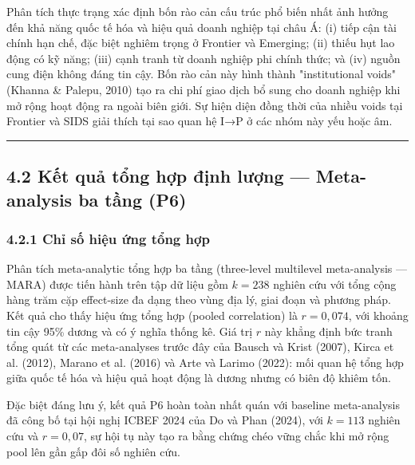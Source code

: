 \documentclass[12pt,a4paper]{article}
\begin{document}
Phân tích thực trạng xác định bốn rào cản cấu trúc phổ biến nhất ảnh
hưởng đến khả năng quốc tế hóa và hiệu quả doanh nghiệp tại châu Á: (i)
tiếp cận tài chính hạn chế, đặc biệt nghiêm trọng ở Frontier và
Emerging; (ii) thiếu hụt lao động có kỹ năng; (iii) cạnh tranh từ doanh
nghiệp phi chính thức; và (iv) nguồn cung điện không đáng tin cậy. Bốn
rào cản này hình thành "institutional voids" (Khanna \& Palepu, 2010)
tạo ra chi phí giao dịch bổ sung cho doanh nghiệp khi mở rộng hoạt động
ra ngoài biên giới. Sự hiện diện đồng thời của nhiều voids tại Frontier
và SIDS giải thích tại sao quan hệ I→P ở các nhóm này yếu hoặc âm.

\begin{center}\rule{0.5\linewidth}{0.5pt}\end{center}

\hypertarget{42-kux1ebft-quux1ea3-tux1ed5ng-hux1ee3p-ux111ux1ecbnh-lux1b0ux1ee3ng--meta-analysis-ba-tux1ea7ng-p6}{%
\subsection{4.2 Kết quả tổng hợp định lượng --- Meta-analysis ba tầng
(P6)}\label{42-kux1ebft-quux1ea3-tux1ed5ng-hux1ee3p-ux111ux1ecbnh-lux1b0ux1ee3ng--meta-analysis-ba-tux1ea7ng-p6}}

\hypertarget{421-chux1ec9-sux1ed1-hiux1ec7u-ux1ee9ng-tux1ed5ng-hux1ee3p}{%
\subsubsection{4.2.1 Chỉ số hiệu ứng tổng
hợp}\label{421-chux1ec9-sux1ed1-hiux1ec7u-ux1ee9ng-tux1ed5ng-hux1ee3p}}

Phân tích meta-analytic tổng hợp ba tầng (three-level multilevel
meta-analysis --- MARA) được tiến hành trên tập dữ liệu gồm \(k = 238\)
nghiên cứu với tổng cộng hàng trăm cặp effect-size đa dạng theo vùng địa
lý, giai đoạn và phương pháp. Kết quả cho thấy hiệu ứng tổng hợp (pooled
correlation) là \(r = 0{,}074\), với khoảng tin cậy 95\% dương và có ý
nghĩa thống kê. Giá trị \(r\) này khẳng định bức tranh tổng quát từ các
meta-analyses trước đây của Bausch và Krist (2007), Kirca et al. (2012),
Marano et al. (2016) và Arte và Larimo (2022): mối quan hệ tổng hợp giữa
quốc tế hóa và hiệu quả hoạt động là dương nhưng có biên độ khiêm tốn.

Đặc biệt đáng lưu ý, kết quả P6 hoàn toàn nhất quán với baseline
meta-analysis đã công bố tại hội nghị ICBEF 2024 của Do và Phan (2024),
với \(k = 113\) nghiên cứu và \(r = 0{,}07\), sự hội tụ này tạo ra bằng
chứng chéo vững chắc khi mở rộng pool lên gần gấp đôi số nghiên cứu.
\end{document}
